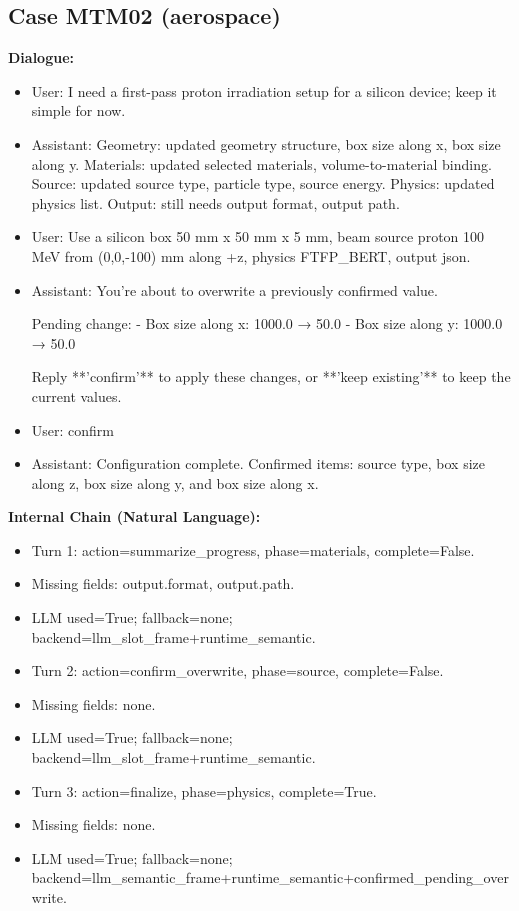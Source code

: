 \documentclass[11pt]{ctexart}
\begin{document}
\subsection{Case MTM02 (aerospace)}
\textbf{Dialogue:}
\begin{itemize}
\item User: I need a first-pass proton irradiation setup for a silicon device; keep it simple for now.
\item Assistant: Geometry: updated geometry structure, box size along x, box size along y. Materials: updated selected materials, volume-to-material binding. Source: updated source type, particle type, source energy. Physics: updated physics list. Output: still needs output format, output path.
\item User: Use a silicon box 50 mm x 50 mm x 5 mm, beam source proton 100 MeV from (0,0,-100) mm along +z, physics FTFP\_BERT, output json.
\item Assistant: You're about to overwrite a previously confirmed value.

Pending change:
- Box size along x: 1000.0 → 50.0
- Box size along y: 1000.0 → 50.0

Reply **'confirm'** to apply these changes, or **'keep existing'** to keep the current values.
\item User: confirm
\item Assistant: Configuration complete. Confirmed items: source type, box size along z, box size along y, and box size along x.
\end{itemize}
\textbf{Internal Chain (Natural Language):}
\begin{itemize}
\item Turn 1: action=summarize\_progress, phase=materials, complete=False.
\item Missing fields: output.format, output.path.
\item LLM used=True; fallback=none; backend=llm\_slot\_frame+runtime\_semantic.
\item Turn 2: action=confirm\_overwrite, phase=source, complete=False.
\item Missing fields: none.
\item LLM used=True; fallback=none; backend=llm\_slot\_frame+runtime\_semantic.
\item Turn 3: action=finalize, phase=physics, complete=True.
\item Missing fields: none.
\item LLM used=True; fallback=none; backend=llm\_semantic\_frame+runtime\_semantic+confirmed\_pending\_overwrite.
\end{itemize}
\end{document}
